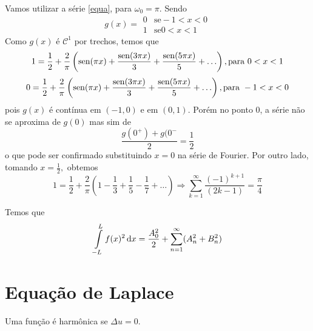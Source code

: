\documentclass[11pt,twoside,a4paper]{book}
\begin{document}
\begin{exemplo}
Vamos utilizar a série \ref{equa}, para $\omega_0 = \pi.$ Sendo
\[
g(x) = \begin{array}{cc}
    0 & \mbox{se} -1 < x < 0  \\
    1  & \mbox{se} 0 < x < 1
\end{array}
\]
Como $g(x)$ é $\mathcal{C}^1$ por trechos, temos que
\[
1 = \frac{1}{2} + \frac{2}{\pi} \left({\rm sen}(\pi x) + \frac{{\rm sen}(3 \pi x)}{3} + \frac{{\rm sen}(5 \pi x)}{5}  + \ldots \right), \mbox{para } 0< x < 1
\]
\[
0 = \frac{1}{2} + \frac{2}{\pi} \left({\rm sen}(\pi x) + \frac{{\rm sen}(3 \pi x)}{3} + \frac{{\rm sen}(5 \pi x)}{5}  + \ldots \right), \mbox{para } -1< x <0
\]
pois $g(x)$ é contínua em $(-1, 0)$ e em $(0, 1)$. Porém no ponto $0$, a série não se aproxima de $g (0)$ mas sim de
\[
\frac{g(0^+) + g(0^{-}}{2} = \frac{1}{2}
\]
o que pode ser confirmado substituindo $x = 0$ na série de Fourier. Por outro lado, tomando $x = \frac{1}{2},$ obtemos
\[1 = \frac{1}{2} + \frac{2}{\pi} \left(1- \frac{1}{3} + \frac{1}{5}  - \frac{1}{7} + \ldots \right) \Rightarrow \boxed{\sum\limits_{k = 1}^\infty \frac{(-1)^{k+1}}{(2k-1)} = \frac{\pi}{4}}
\]
\end{exemplo}

\begin{teorema}[Parseval]
Temos que
\[
\int\limits_{- L}^L f(x)^2 \dif x = \frac{A_0^2}{2} + \sum\limits_{n = 1}^\infty (A_n^2 + B_n^2)
\]
\end{teorema}

\section{Equação de Laplace}
\begin{definicao}
Uma função é harmônica se $\Delta u = 0.$
\end{definicao}
\end{document}
